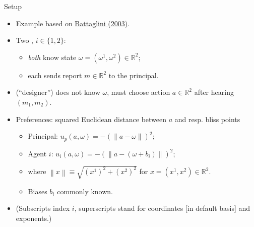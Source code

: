\documentclass[english,10pt
,aspectratio=169
]{beamer}
\begin{document}
\begin{frame}{Setup}
\begin{itemize}
	\item Example based on \href{https://onlinelibrary.wiley.com/doi/abs/10.1111/1468-0262.00336}{\uline{Battaglini (2003)}}.
	\item Two , $i \in \{1,2\}$:
	\begin{itemize}
		\item \emph{both} know \alert{state} $\omega = (\omega^1,\omega^2) \in \mathbb{R}^2$;
		\item each sends \alert{report} $m \in \mathbb{R}^2$ to the principal.
	\end{itemize}
	\item {} (``designer'') does not know $\omega$, must choose action $a \in \mathbb{R}^2$ \alert{after} hearing $(m_1,m_2)$.
	\item Preferences: squared Euclidean distance between $a$ and resp. \alert{bliss points}
	\begin{itemize}
		\item Principal: $u_p (a,\omega) = -\left(\left\|a-\omega\right\| \right)^2$;
		\item Agent $i$: $u_i (a,\omega) = -\left(\left\|a-(\omega+b_i)\right\| \right)^2$;
		\item where $\left\|x\right\| \equiv \sqrt{(x^1)^2 + (x^2)^2}$ for $x = (x^1,x^2) \in \mathbb{R}^2$.
		\item \alert{Biases} $b_i$ commonly known.
	\end{itemize}
	\item (Subscripts index $i$, superscripts stand for coordinates [in default basis] and exponents.)
\end{itemize}
\end{frame}
\end{document}
